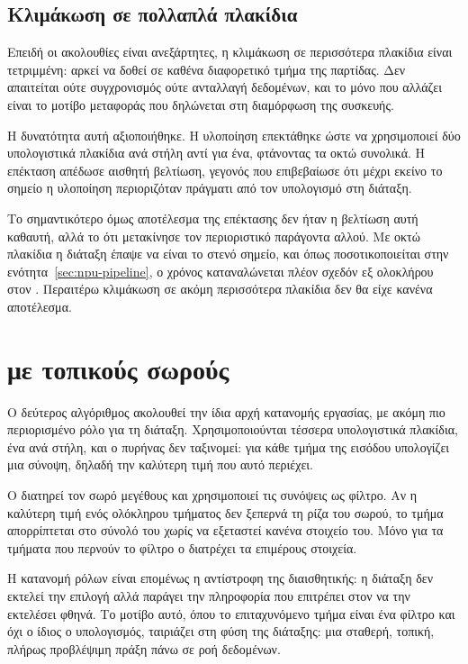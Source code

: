 \subsection{Κλιμάκωση σε πολλαπλά πλακίδια}
\label{sec:npu-bitonic-tiles}

Επειδή οι ακολουθίες είναι ανεξάρτητες, η κλιμάκωση σε περισσότερα πλακίδια
είναι τετριμμένη: αρκεί να δοθεί σε καθένα διαφορετικό τμήμα της παρτίδας. Δεν
απαιτείται ούτε συγχρονισμός ούτε ανταλλαγή δεδομένων, και το μόνο που αλλάζει
είναι το μοτίβο μεταφοράς που δηλώνεται στη διαμόρφωση της συσκευής.

Η δυνατότητα αυτή αξιοποιήθηκε. Η υλοποίηση επεκτάθηκε ώστε να χρησιμοποιεί δύο
υπολογιστικά πλακίδια ανά στήλη αντί για ένα, φτάνοντας τα οκτώ συνολικά. Η
επέκταση απέδωσε αισθητή βελτίωση, γεγονός που επιβεβαίωσε ότι μέχρι εκείνο το
σημείο η υλοποίηση περιοριζόταν πράγματι από τον υπολογισμό στη διάταξη.

Το σημαντικότερο όμως αποτέλεσμα της επέκτασης δεν ήταν η βελτίωση αυτή καθαυτή,
αλλά το ότι μετακίνησε τον περιοριστικό παράγοντα αλλού. Με οκτώ πλακίδια η
διάταξη έπαψε να είναι το στενό σημείο, και όπως ποσοτικοποιείται στην
ενότητα~\ref{sec:npu-pipeline}, ο χρόνος καταναλώνεται πλέον σχεδόν εξ ολοκλήρου
στον . Περαιτέρω κλιμάκωση σε ακόμη περισσότερα πλακίδια δεν θα είχε
κανένα αποτέλεσμα.

\section{ με τοπικούς σωρούς}
\label{sec:npu-mapreduce}

Ο δεύτερος αλγόριθμος ακολουθεί την ίδια αρχή κατανομής εργασίας, με ακόμη πιο
περιορισμένο ρόλο για τη διάταξη. Χρησιμοποιούνται τέσσερα υπολογιστικά
πλακίδια, ένα ανά στήλη, και ο πυρήνας δεν ταξινομεί: για κάθε τμήμα της εισόδου
υπολογίζει μια σύνοψη, δηλαδή την καλύτερη τιμή που αυτό περιέχει.

Ο  διατηρεί τον σωρό μεγέθους  και χρησιμοποιεί τις συνόψεις ως
φίλτρο. Αν η καλύτερη τιμή ενός ολόκληρου τμήματος δεν ξεπερνά τη ρίζα του
σωρού, το τμήμα απορρίπτεται στο σύνολό του χωρίς να εξεταστεί κανένα στοιχείο
του. Μόνο για τα τμήματα που περνούν το φίλτρο ο  διατρέχει τα επιμέρους
στοιχεία.

Η κατανομή ρόλων είναι επομένως η αντίστροφη της διαισθητικής: η διάταξη δεν
εκτελεί την επιλογή αλλά παράγει την πληροφορία που επιτρέπει στον  να
την εκτελέσει φθηνά. Το μοτίβο αυτό, όπου το επιταχυνόμενο τμήμα είναι ένα
φίλτρο και όχι ο ίδιος ο υπολογισμός, ταιριάζει στη φύση της διάταξης: μια
σταθερή, τοπική, πλήρως προβλέψιμη πράξη πάνω σε ροή δεδομένων.

